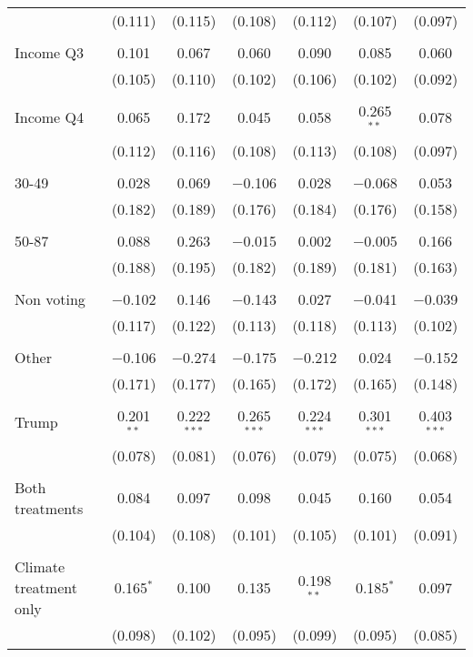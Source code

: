 \begin{tabular}{@{\extracolsep{5pt}}lcccccc}
  & (0.111) & (0.115) & (0.108) & (0.112) & (0.107) & (0.097) \\ 
  & & & & & & \\ 
 Income Q3 & 0.101 & 0.067 & 0.060 & 0.090 & 0.085 & 0.060 \\ 
  & (0.105) & (0.110) & (0.102) & (0.106) & (0.102) & (0.092) \\ 
  & & & & & & \\ 
 Income Q4 & 0.065 & 0.172 & 0.045 & 0.058 & 0.265$^{**}$ & 0.078 \\ 
  & (0.112) & (0.116) & (0.108) & (0.113) & (0.108) & (0.097) \\ 
  & & & & & & \\ 
 30-49 & 0.028 & 0.069 & $-$0.106 & 0.028 & $-$0.068 & 0.053 \\ 
  & (0.182) & (0.189) & (0.176) & (0.184) & (0.176) & (0.158) \\ 
  & & & & & & \\ 
 50-87 & 0.088 & 0.263 & $-$0.015 & 0.002 & $-$0.005 & 0.166 \\ 
  & (0.188) & (0.195) & (0.182) & (0.189) & (0.181) & (0.163) \\ 
  & & & & & & \\ 
 Non voting & $-$0.102 & 0.146 & $-$0.143 & 0.027 & $-$0.041 & $-$0.039 \\ 
  & (0.117) & (0.122) & (0.113) & (0.118) & (0.113) & (0.102) \\ 
  & & & & & & \\ 
 Other & $-$0.106 & $-$0.274 & $-$0.175 & $-$0.212 & 0.024 & $-$0.152 \\ 
  & (0.171) & (0.177) & (0.165) & (0.172) & (0.165) & (0.148) \\ 
  & & & & & & \\ 
 Trump & 0.201$^{**}$ & 0.222$^{***}$ & 0.265$^{***}$ & 0.224$^{***}$ & 0.301$^{***}$ & 0.403$^{***}$ \\ 
  & (0.078) & (0.081) & (0.076) & (0.079) & (0.075) & (0.068) \\ 
  & & & & & & \\ 
 Both treatments & 0.084 & 0.097 & 0.098 & 0.045 & 0.160 & 0.054 \\ 
  & (0.104) & (0.108) & (0.101) & (0.105) & (0.101) & (0.091) \\ 
  & & & & & & \\ 
 Climate treatment only & 0.165$^{*}$ & 0.100 & 0.135 & 0.198$^{**}$ & 0.185$^{*}$ & 0.097 \\ 
  & (0.098) & (0.102) & (0.095) & (0.099) & (0.095) & (0.085) \\ 

\end{tabular}

